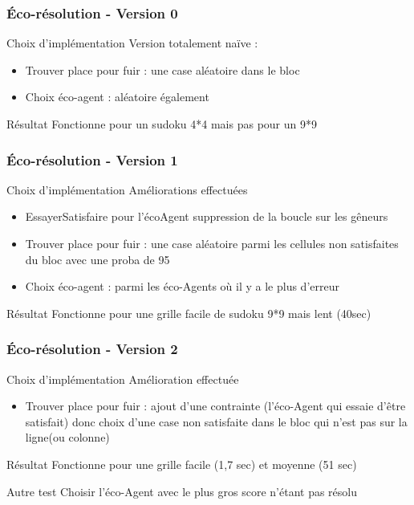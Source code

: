 \begin{frame}
    \frametitle{Éco-résolution - Version 0}
    \begin{block}{Choix d'implémentation}
    		Version totalement naïve :
    		\begin{itemize}
    			\item Trouver place pour fuir : une case aléatoire dans le bloc
    			\item Choix éco-agent : aléatoire également
    		\end{itemize}
    \end{block}
    \pause
    \begin{alertblock}{Résultat}
    		Fonctionne pour un sudoku 4*4 mais pas pour un 9*9
    \end{alertblock}
\end{frame}


\begin{frame}
    \frametitle{Éco-résolution - Version 1}
    \begin{block}{Choix d'implémentation}
    		Améliorations effectuées
    		\begin{itemize}
    			\item EssayerSatisfaire pour l'écoAgent suppression de la boucle sur les gêneurs
    			\item Trouver place pour fuir : une case aléatoire parmi les cellules non satisfaites du bloc avec une proba de 95%
    			\item Choix éco-agent : parmi les éco-Agents où il y a le plus d'erreur 
    		\end{itemize}
    \end{block}
    \pause
    \begin{alertblock}{Résultat}
    		Fonctionne pour une grille facile de sudoku 9*9 mais lent (40sec)
    \end{alertblock}
\end{frame}

\begin{frame}
    \frametitle{Éco-résolution - Version 2}
    \begin{block}{Choix d'implémentation}
    		Amélioration effectuée
    		\begin{itemize}
    			\item Trouver place pour fuir : ajout d'une contrainte (l'éco-Agent qui essaie d'être satisfait) donc choix d'une case non satisfaite dans le bloc qui n'est pas sur la ligne(ou colonne)
    		\end{itemize}
    \end{block}
    \pause
    \begin{alertblock}{Résultat}
    		Fonctionne pour une grille facile (1,7 sec) et moyenne (51 sec)
    \end{alertblock}
    \pause
    \begin{exampleblock}{Autre test}
		Choisir l'éco-Agent avec le plus gros score n'étant pas résolu
	\end{exampleblock}
\end{frame}


